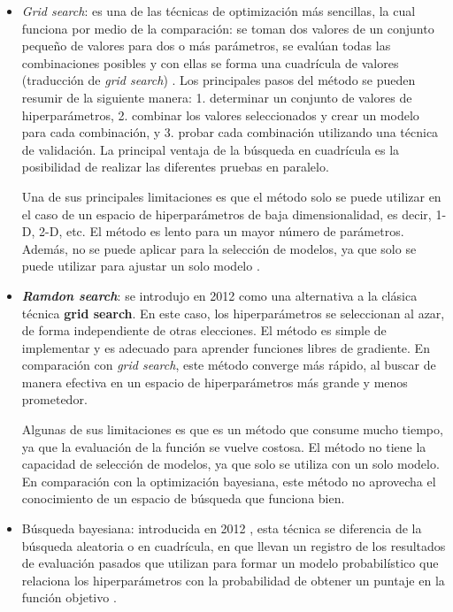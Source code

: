 \documentclass{report}
\begin{document}
\begin{itemize}
    \item \textit{Grid search}: es una de las técnicas de optimización más sencillas, la cual funciona por medio de la comparación: se toman dos valores de un conjunto pequeño de valores para dos o más parámetros, se evalúan todas las combinaciones posibles y con ellas se forma una cuadrícula de valores (traducción de \textit{grid search}) \cite{EnlaceGridSearch}. Los principales pasos del método se pueden resumir de la siguiente manera: 1. determinar un conjunto de valores de hiperparámetros, 2. combinar los valores seleccionados y crear un modelo para cada combinación, y 3. probar cada combinación utilizando una técnica de validación. La principal ventaja de la búsqueda en cuadrícula es la posibilidad de realizar las diferentes pruebas en paralelo.

    Una de sus principales limitaciones es que el método solo se puede utilizar en el caso de un espacio de hiperparámetros de baja dimensionalidad, es decir, 1-D, 2-D, etc. El método es lento para un mayor número de parámetros. Además, no se puede aplicar para la selección de modelos, ya que solo se puede utilizar para ajustar un solo modelo \cite{PaperComparandoOptimaz}.

    \item \textbf{\textit{Ramdon search}}: se introdujo en 2012 \cite{PaperRamdonSearch} como una alternativa a la clásica técnica \textbf{grid search}. En este caso, los hiperparámetros se seleccionan al azar, de forma independiente de otras elecciones. El método es simple de implementar y es adecuado para aprender funciones libres de gradiente. En comparación con \textit{grid search}, este método converge más rápido, al buscar de manera efectiva en un espacio de hiperparámetros más grande y menos prometedor.
    
    Algunas de sus limitaciones es que es un método que consume mucho tiempo, ya que la evaluación de la función se vuelve costosa. El método no tiene la capacidad de selección de modelos, ya que solo se utiliza con un solo modelo. En comparación con la optimización bayesiana, este método no aprovecha el conocimiento de un espacio de búsqueda que funciona bien.


    \item Búsqueda bayesiana: introducida en 2012 \cite{PaperBayesian}, esta técnica se diferencia de la búsqueda aleatoria o en cuadrícula, en que llevan un registro de los resultados de evaluación pasados que utilizan para formar un modelo probabilístico que relaciona los hiperparámetros con la probabilidad de obtener un puntaje en la función objetivo \cite{BayesianSearchMedium}.
    

\end{itemize}
\end{document}
